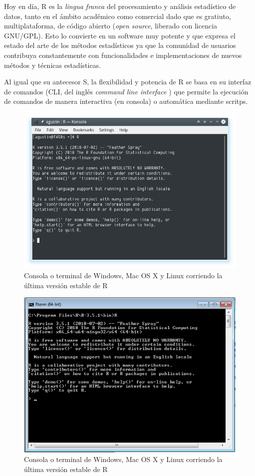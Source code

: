 \documentclass[a4paper]{book}
\begin{document}
Hoy en día, R es la \emph{lingua franca} del procesamiento y análisis
estadístico de datos, tanto en el ámbito académico como comercial dado
que es gratiuto, multiplataforma, de código abierto (\emph{open source},
liberado con licencia GNU/GPL). Esto lo convierte en un software muy
potente y que expresa el estado del arte de los métodos estadísticos ya
que la comunidad de usuarios contribuya constantemente con
funcionalidades e implementaciones de nuevos métodos y técnicas
estadísticas.

Al igual que su antecesor S, la flexibilidad y potencia de R se basa en
su interfaz de comandos (CLI, del inglés \emph{command line interface} )
que permite la ejecución de comandos de manera interactiva (en consola)
o automática mediante scritps.

\begin{figure}[h]

{\centering \includegraphics[width=0.75\linewidth,]{images/consola_linux} 

}

\caption{Consola o terminal de Windows, Mac OS X y Linux corriendo la última versión estable de R}\label{fig:unnamed-chunk-171}
\end{figure}
\begin{figure}[h]

{\centering \includegraphics[width=0.75\linewidth,]{images/consola_windows} 

}

\caption{Consola o terminal de Windows, Mac OS X y Linux corriendo la última versión estable de R}\label{fig:unnamed-chunk-172}
\end{figure}
\end{document}
